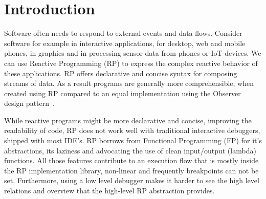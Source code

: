 \section{Introduction}

Software often needs to respond to external events and data flows. Consider software for example in interactive applications, for desktop, web and mobile phones, in graphics and in processing sensor data from phones or IoT-devices. We can use Reactive Programming (RP) to express the complex reactive behavior of these applications. RP offers declarative and concise syntax for composing streams of data. As a result programs are generally more comprehensible, when created using RP compared to an equal implementation using the Observer design pattern~\cite{johnson1995design, salvaneschi2014empirical}.



While reactive programs might be more declarative and concise, improving the readability of code, RP does not work well with traditional interactive debuggers, shipped with most IDE's. RP borrows from Functional Programming (FP) for it's abstractions, its laziness and advocating the use of clean input/output (lambda) functions. All those features contribute to an execution flow that is mostly inside the RP implementation library, non-linear and frequently breakpoints can not be set. Furthermore, using a low level debugger makes it harder to see the high level relations and overview that the high-level RP abstraction provides.

